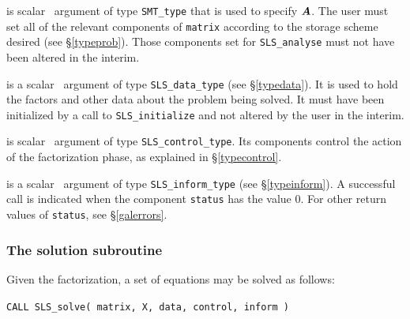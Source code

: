 \documentclass{galahad}
\newcommand{\packagename}{SLS}
\begin{document}
\begin{description}

 is scalar \intentin\ argument of type {\tt SMT\_type}
that is used to specify ${\bm{A}}$.
The user must set all of the relevant components of {\tt matrix} according
to the storage scheme desired (see \S\ref{typeprob}). Those components
set for {\tt \packagename\_analyse} must not have been altered in the interim.

 is a scalar \intentinout\ argument of type
{\tt \packagename\_data\_type}
(see \S\ref{typedata}). It is used to hold the factors and other
data about the problem being solved.
It must have been initialized by a call to
{\tt \packagename\_ini\-tialize} and not altered by the user in the interim.

 is scalar \intentin\ argument of type
{\tt \packagename\_control\_type}. Its components control the action
of the factorization phase, as explained in
\S\ref{typecontrol}.

 is a scalar \intentinout\ argument of type
{\tt \packagename\_inform\_type}
(see \S\ref{typeinform}).
A successful call is indicated when the  component {\tt status} has the value 0.
For other return values of {\tt status}, see \S\ref{galerrors}.

\end{description}


\subsubsection{The solution subroutine}
\label{solve}
Given the factorization, a set of equations may be solved as follows:

\hskip0.5in
{\tt CALL \packagename\_solve( matrix, X, data, control, inform )}
\end{document}
